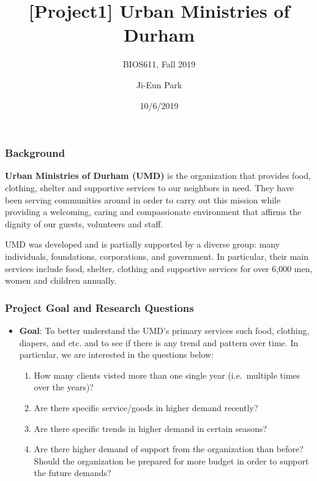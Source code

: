 \documentclass[]{article}
\title{{[}Project1{]} Urban Ministries of Durham}
\subtitle{BIOS611, Fall 2019}
\author{Ji-Eun Park}
\date{10/6/2019}
\providecommand{\tightlist}{%
  \setlength{\itemsep}{0pt}\setlength{\parskip}{0pt}}
\begin{document}
\maketitle

\hypertarget{background}{%
\subsubsection{Background}\label{background}}

\textbf{Urban Ministries of Durham (UMD)} is the organization that
provides food, clothing, shelter and supportive services to our
neighbors in need. They have been serving communities around in order to
carry out this mission while providing a welcoming, caring and
compassionate environment that affirms the dignity of our guests,
volunteers and staff.

UMD was developed and is partially supported by a diverse group: many
individuals, foundations, corporations, and government. In particular,
their main services include food, shelter, clothing and supportive
services for over 6,000 men, women and children annually.

\hypertarget{project-goal-and-research-questions}{%
\subsubsection{Project Goal and Research
Questions}\label{project-goal-and-research-questions}}

\begin{itemize}
\item
  \textbf{Goal}: To better understand the UMD's primary services such
  food, clothing, diapers, and etc. and to see if there is any trend and
  pattern over time. In particular, we are interested in the questions
  below:

  \begin{enumerate}
  \def\labelenumi{\arabic{enumi}.}
  \tightlist
  \item
    How many clients visted more than one single year (i.e.~multiple
    times over the years)?
  \item
    Are there specific service/goods in higher demand recently?
  \item
    Are there specific trends in higher demand in certain seasons?
  \item
    Are there higher demand of support from the organization than
    before? Should the organization be prepared for more budget in order
    to support the future demands?
  \end{enumerate}
\end{itemize}
\end{document}

